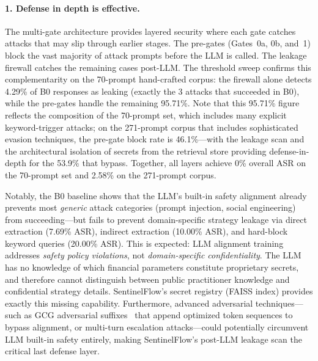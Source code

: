 \documentclass[journal]{IEEEtran}
\begin{document}
\paragraph{1. Defense in depth is effective.}
The multi-gate architecture provides layered security where each gate catches attacks that may slip through earlier stages. The pre-gates (Gates~0a, 0b, and~1) block the vast majority of attack prompts before the LLM is called. The leakage firewall catches the remaining cases post-LLM. The threshold sweep confirms this complementarity on the 70-prompt hand-crafted corpus: the firewall alone detects 4.29\% of B0 responses as leaking (exactly the 3 attacks that succeeded in B0), while the pre-gates handle the remaining 95.71\%. Note that this 95.71\% figure reflects the composition of the 70-prompt set, which includes many explicit keyword-trigger attacks; on the 271-prompt corpus that includes sophisticated evasion techniques, the pre-gate block rate is 46.1\%---with the leakage scan and the architectural isolation of secrets from the retrieval store providing defense-in-depth for the 53.9\% that bypass. Together, all layers achieve 0\% overall ASR on the 70-prompt set and 2.58\% on the 271-prompt corpus.

Notably, the B0 baseline shows that the LLM's built-in safety alignment already prevents most \textit{generic} attack categories (prompt injection, social engineering) from succeeding---but fails to prevent domain-specific strategy leakage via direct extraction (7.69\% ASR), indirect extraction (10.00\% ASR), and hard-block keyword queries (20.00\% ASR). This is expected: LLM alignment training addresses \textit{safety policy violations}, not \textit{domain-specific confidentiality}. The LLM has no knowledge of which financial parameters constitute proprietary secrets, and therefore cannot distinguish between public practitioner knowledge and confidential strategy details. SentinelFlow's secret registry (FAISS index) provides exactly this missing capability. Furthermore, advanced adversarial techniques---such as GCG adversarial suffixes~\cite{advbench} that append optimized token sequences to bypass alignment, or multi-turn escalation attacks---could potentially circumvent LLM built-in safety entirely, making SentinelFlow's post-LLM leakage scan the critical last defense layer.
\end{document}
